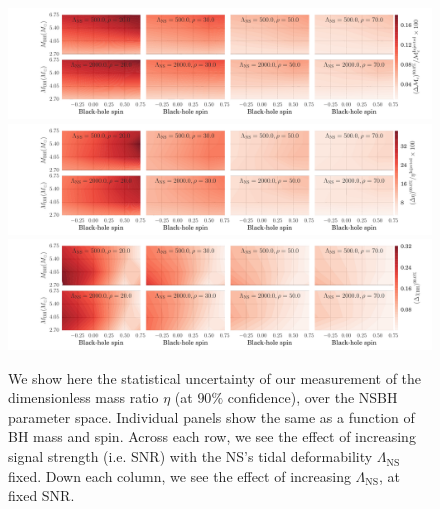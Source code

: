 \documentclass[aps,prd,amsmath,floats,floatfix, twocolumn,
superscriptaddress,nofootinbib,showpacs]{revtex4-1}
\newcommand{\lambdans}{\Lambda_\mathrm{NS}}
\begin{document}
\begin{figure}
\centering 
\includegraphics[trim = {2cm 0 0 0},width=2.1\columnwidth]{plots/TNMchirpCIWidths90_0_Lambda_SNR}\\
\includegraphics[trim = {2cm 0 0 0},width=2.1\columnwidth]{plots/TNEtaCIWidths90_0_Lambda_SNR}\\
\includegraphics[trim = {2cm 0 0 0},width=2.1\columnwidth]{plots/TNChiBHCIWidths90_0_Lambda_SNR}
\caption{
We show here the statistical uncertainty of our measurement of the 
dimensionless mass ratio $\eta$ (at $90\%$ confidence), over the NSBH
parameter space.
Individual panels show the same as a function of BH mass and spin.
Across each row, we see the effect of increasing signal strength (i.e.
SNR) with the NS's tidal deformability $\lambdans$ fixed. Down each
column, we see the effect of increasing $\lambdans$, at fixed SNR.
}
\label{fig:CIWidths90_Lambda_SNR}
\end{figure}
\end{document}
